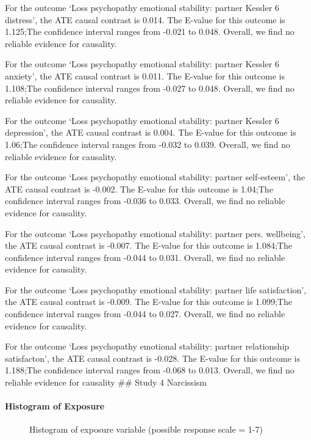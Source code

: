 \documentclass[
  singlecolumn]{article}
\let\oldparagraph\paragraph
\renewcommand{\paragraph}[1]{\oldparagraph{#1}\mbox{}}
\begin{document}
For the outcome `Loss psychopathy emotional stability: partner Kessler 6
distress', the ATE causal contrast is 0.014. The E-value for this
outcome is 1.125;The confidence interval ranges from -0.021 to 0.048.
Overall, we find no reliable evidence for causality.

For the outcome `Loss psychopathy emotional stability: partner Kessler 6
anxiety', the ATE causal contrast is 0.011. The E-value for this outcome
is 1.108;The confidence interval ranges from -0.027 to 0.048. Overall,
we find no reliable evidence for causality.

For the outcome `Loss psychopathy emotional stability: partner Kessler 6
depression', the ATE causal contrast is 0.004. The E-value for this
outcome is 1.06;The confidence interval ranges from -0.032 to 0.039.
Overall, we find no reliable evidence for causality.

For the outcome `Loss psychopathy emotional stability: partner
self-esteem', the ATE causal contrast is -0.002. The E-value for this
outcome is 1.04;The confidence interval ranges from -0.036 to 0.033.
Overall, we find no reliable evidence for causality.

For the outcome `Loss psychopathy emotional stability: partner pers.
wellbeing', the ATE causal contrast is -0.007. The E-value for this
outcome is 1.084;The confidence interval ranges from -0.044 to 0.031.
Overall, we find no reliable evidence for causality.

For the outcome `Loss psychopathy emotional stability: partner life
satisfaction', the ATE causal contrast is -0.009. The E-value for this
outcome is 1.099;The confidence interval ranges from -0.044 to 0.027.
Overall, we find no reliable evidence for causality.

For the outcome `Loss psychopathy emotional stability: partner
relationship satisfacton', the ATE causal contrast is -0.028. The
E-value for this outcome is 1.188;The confidence interval ranges from
-0.068 to 0.013. Overall, we find no reliable evidence for causality
\#\# Study 4 Narcissism

\paragraph{Histogram of Exposure}\label{histogram-of-exposure-3}

\begin{figure}


\caption{\label{fig-histogram-narcissism}Histogram of exposure variable
(possible response scale = 1-7)}

\end{figure}%
\end{document}
